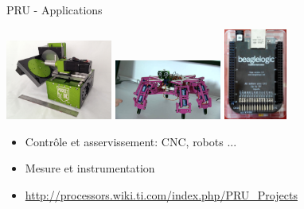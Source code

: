 \documentclass{beamer}
\begin{document}
\begin{frame}{PRU - Applications}

  \begin{center}
    \includegraphics[width=35mm]{pic/pocketnc.jpg}
    \hspace{0.400mm}
    \includegraphics[width=35mm]{pic/spiderbot.jpg}
    \hspace{0.400mm}
    \includegraphics[height=30mm]{pic/beaglelogic.jpg}
  \end{center}

  \begin{small}
    \begin{itemize}
    \item Contr\^ole et asservissement: CNC, robots ...
    \item Mesure et instrumentation
    \item \url{http://processors.wiki.ti.com/index.php/PRU_Projects}
    \end{itemize}
  \end{small}
\end{frame}
\end{document}
